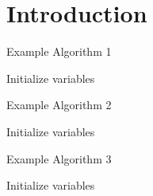 \documentclass{book} %
\newcounter{algorithm}
\begin{document}
\chapter{Introduction}

\begin{algorithm}
  \caption{Example Algorithm 1}
  Initialize variables\;
\end{algorithm}

\begin{algorithm}
  \caption{Example Algorithm 2}
  Initialize variables\;
\end{algorithm}

\begin{algorithm}
  \caption{Example Algorithm 3}
  Initialize variables\;
\end{algorithm}
\end{document}
